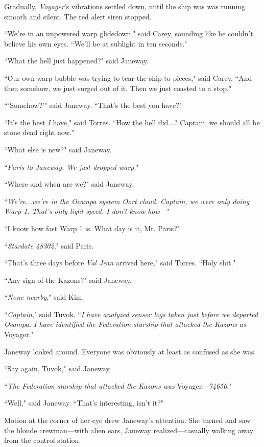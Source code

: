 \documentclass[twoside,letterpaper,12pt]{memoir}
\begin{document}
Gradually, \textit{Voyager}'s vibrations settled down, until the ship was was running smooth and silent. The red alert siren stopped.

``We're in an unpowered warp glidedown," said Carey, sounding like he couldn't believe his own eyes. ``We'll be at sublight in ten seconds."

``What the hell just happened?" said Janeway.

``Our own warp bubble was trying to tear the ship to pieces," said Carey. ``And then somehow, we just surged out of it. Then we just coasted to a stop."

```Somehow?'" said Janeway. ``That's the best you have?"

``It's the best \textit{I} have," said Torres. ``How the hell did...? Captain, we should all be stone dead right now."

``What else is new?" said Janeway.

``\textit{Paris to Janeway. We just dropped warp}."

``Where and when are we?" said Janeway.

``\textit{We're...we're in the Ocampa system Oort cloud. Captain, we were only doing Warp 1. That's only light speed. I don't know how---}"

``I know how fast Warp 1 is. What day is it, Mr. Paris?"

``\textit{Stardate 48302}," said Paris.

``That's three days before \textit{Val Jean} arrived here," said Torres. ``Holy shit."

``Any sign of the Kazons?" said Janeway.

``\textit{None nearby}," said Kim.

``\textit{Captain}," said Tuvok. ``\textit{I have analyzed sensor logs taken just before we departed Ocampa. I have identified the Federation starship that attacked the Kazons as}  Voyager."

Janeway looked around. Everyone was obviously at least as confused as she was.

``Say again, Tuvok," said Janeway.

``\textit{The Federation starship that attacked the Kazons was}  Voyager. \textit{-74656}."

``Well," said Janeway. ``That's interesting, isn't it?"

Motion at the corner of her eye drew Janeway's attention. She turned and saw the blonde crewman---with alien ears, Janeway realized---casually walking away from the control station.
\end{document}
